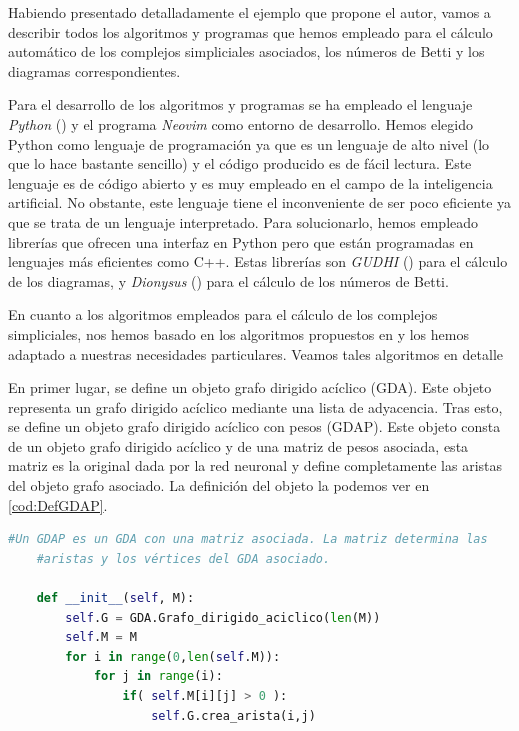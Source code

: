 \documentclass[12pt, a4paper, twoside]{book}
\numberwithin{equation}{section}
\theoremstyle{definition}
\theoremstyle{remark}
\theoremstyle{plain}
\begin{document}
	Habiendo presentado detalladamente el ejemplo que propone el autor, 
	vamos a describir todos los algoritmos y programas que hemos empleado
	para el cálculo automático de los complejos simpliciales asociados, 
	los números de Betti y los diagramas correspondientes.

	Para el desarrollo de los algoritmos y programas se ha empleado el 
	lenguaje \emph{Python} (\cite{10.5555/1593511}) y el programa 
	\emph{Neovim} como entorno de desarrollo. Hemos elegido Python como 
	lenguaje de programación ya que es un lenguaje de alto nivel (lo que 
	lo hace bastante sencillo) y el código producido es de fácil lectura. 
	Este lenguaje es de código abierto y es muy empleado en el campo de la 
	inteligencia artificial. No obstante, este lenguaje tiene el 
	inconveniente de ser poco eficiente ya que se trata de un lenguaje 
	interpretado. Para solucionarlo, hemos empleado librerías que ofrecen 
	una interfaz en Python pero que están programadas en lenguajes más 
	eficientes como C++. Estas librerías son \emph{GUDHI} 
	(\cite{gudhi:urm}) para el cálculo de los diagramas, y \emph{Dionysus} 
	(\cite{morozov_2021}) para el cálculo de los números de Betti.

	En cuanto a los algoritmos empleados para el cálculo de los complejos
	simpliciales, nos hemos basado en los algoritmos propuestos en 
	\cite{Algoritmos-Sedgewick} y los hemos adaptado a nuestras 
	necesidades particulares. Veamos tales algoritmos en detalle

	En primer lugar, se define un objeto grafo dirigido acíclico (GDA). 
	Este objeto representa un grafo dirigido acíclico mediante una lista 
	de adyacencia. Tras esto, se define un objeto grafo dirigido acíclico 
	con pesos (GDAP). Este objeto consta de un objeto grafo dirigido 
	acíclico y de una matriz de pesos asociada, esta matriz es la original 
	dada por la red neuronal y define completamente las aristas del objeto 
	grafo asociado. La definición del objeto la podemos ver en 
	\autoref{cod:DefGDAP}.

	\begin{lstlisting}[language=Python, float=htbp, label=cod:DefGDAP, caption= 
	Definición del objeto GDAP]
	#Un GDAP es un GDA con una matriz asociada. La matriz determina las 
	#aristas y los vértices del GDA asociado.
    	
	def __init__(self, M):
        self.G = GDA.Grafo_dirigido_aciclico(len(M))
        self.M = M
        for i in range(0,len(self.M)):
            for j in range(i):
                if( self.M[i][j] > 0 ):
                    self.G.crea_arista(i,j)
		    
	\end{lstlisting}
\end{document}
